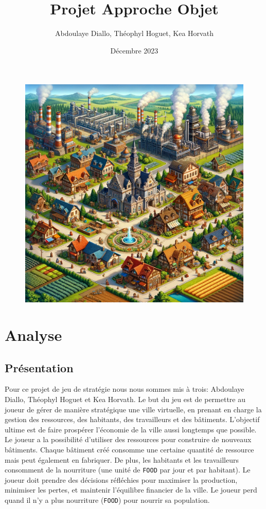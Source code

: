 \documentclass[a4paper,11pt]{article}
\begin{document}
\title{Projet Approche Objet}
\author{Abdoulaye Diallo, Théophyl Hoguet, Kea Horvath}
\date{Décembre 2023}
\begin{figure}
	\centering
	\includegraphics[width=0.75\linewidth]{Game.png}
	\label{fig:enter-label}
\end{figure}

\maketitle

\clearpage %

\tableofcontents %

\clearpage %

\section{Analyse}
\subsection{Présentation}

\par
Pour ce projet de jeu de stratégie nous nous sommes mis à trois: Abdoulaye Diallo, Théophyl Hoguet et Kea Horvath. Le but du jeu est de permettre au joueur de gérer de manière stratégique une ville virtuelle, en prenant en charge la gestion des ressources, des habitants, des travailleurs et des bâtiments. L'objectif ultime est de faire prospérer l'économie de la ville aussi longtemps que possible. Le joueur a la possibilité d'utiliser des ressources pour construire de nouveaux bâtiments. Chaque bâtiment créé consomme une certaine quantité de ressource mais peut également en fabriquer. De plus, les habitants et les travailleurs consomment de la nourriture (une unité de \texttt{FOOD} par jour et par habitant). Le joueur doit prendre des décisions réfléchies pour maximiser la production, minimiser les pertes, et maintenir l'équilibre financier de la ville. Le joueur perd quand il n'y a plus nourriture (\texttt{FOOD}) pour nourrir sa population.
\end{document}
